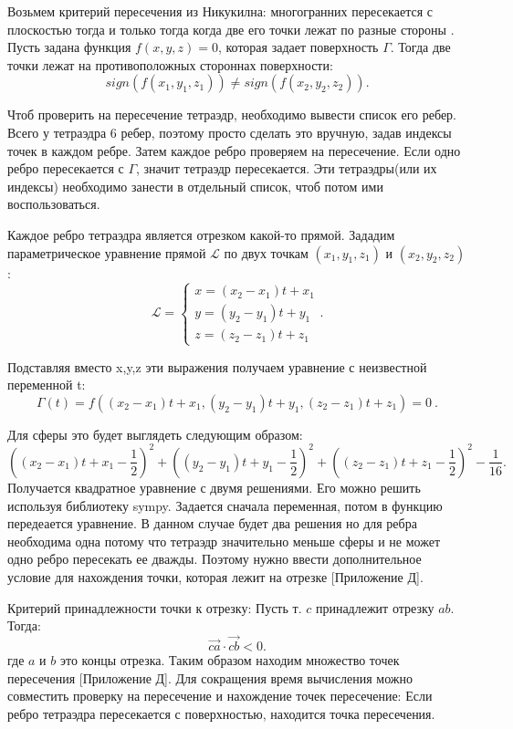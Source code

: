 Возьмем критерий пересечения из Никукилна: многогранних пересекается с плоскостью тогда и только тогда когда две его точки лежат по разные стороны \cite[c.~81]{nikulin}.
Пусть задана функция $f(x,y,z) = 0$, которая задает поверхность $\Gamma$. Тогда две точки лежат на противоположных стороннах поверхности: 
$$sign(f(x_{1},y_{1},z_{1})) \neq sign(f(x_{2},y_{2},z_{2})).$$

Чтоб проверить на пересечение тетраэдр, необходимо вывести список его ребер. Всего у тетраэдра 6 ребер, поэтому просто сделать это вручную, задав индексы точек в каждом ребре. Затем каждое ребро проверяем на пересечение. Если одно ребро пересекается с $\Gamma$, значит тетраэдр пересекается. Эти тетраэдры(или их индексы) необходимо занести в отдельный список, чтоб потом ими воспользоваться. 

Каждое ребро тетраэдра является отрезком какой-то прямой. Зададим параметрическое уравнение прямой $\mathscr{L}$ по двух точкам $(x_{1},y_{1},z_{1})$ и $(x_{2},y_{2},z_{2})$:
$$\mathscr{L}=\left\{ \begin{array}{c}
        x = (x_{2} - x_{1})t + x_{1} \\
        y = (y_{2} - y_{1})t + y_{1}\\
        z = (z_{2} - z_{1})t + z_{1}
    \end{array}{} \right . .$$

Подставляя вместо x,y,z эти выражения получаем уравнение с неизвестной переменной t: 
$$\Gamma(t) = 
f((x_{2} - x_{1})t + x_{1},
(y_{2} - y_{1})t + y_{1},
(z_{2} - z_{1})t + z_{1}) = 0~.$$

Для сферы это будет выглядеть следующим образом:
$$((x_{2} - x_{1})t + x_{1}-\frac{1}{2})^{2} + 
((y_{2} - y_{1})t + y_{1}-\frac{1}{2})^{2}
+ ((z_{2} - z_{1})t + z_{1}-\frac{1}{2})^{2} - \frac{1}{16}.$$
Получается квадратное уравнение с двумя решениями. Его можно решить используя библиотеку sympy. Задается сначала переменная, потом в функцию передеается уравнение. В данном случае будет два решения но для ребра необходима одна потому что тетраэдр значительно меньше сферы и не может одно ребро пересекать ее дважды. Поэтому нужно ввести дополнительное условие для нахождения точки, которая лежит на отрезке [Приложение Д]. 

Критерий принадлежности точки к отрезку:
Пусть т. $c$ принадлежит отрезку $ab$. Тогда:
$$ \vec{ca}\cdot\vec{cb} < 0.$$
где $a$ и $b$ это концы отрезка. Таким образом находим множество точек пересечения [Приложение Д]. 
Для сокращения время вычисления можно совместить проверку на пересечение и нахождение точек пересечение: Если ребро тетраэдра пересекается с поверхностью, находится точка пересечения. 

